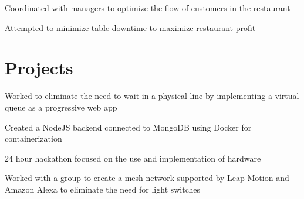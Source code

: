 \documentclass[letterpaper]{deedy-resume} %
\begin{document}
\begin{minipage}[t]{0.66\textwidth}
\sectionspace %




\begin{tightitemize}
\item Coordinated with managers to optimize the flow of customers in the
restaurant
\item Attempted to minimize table downtime to maximize restaurant profit
\end{tightitemize}

\sectionspace %


\section{Projects}


\begin{tightitemize}
\item Worked to eliminate the need to wait in a physical line by implementing a virtual queue as a progressive web app 
\item Created a NodeJS backend connected to MongoDB using Docker for containerization
\end{tightitemize}

\sectionspace %



\begin{tightitemize}
\item 24 hour hackathon focused on the use and
implementation of hardware
\item Worked with a group to create a mesh
network supported by Leap Motion and
Amazon Alexa to eliminate the need for
light switches
\end{tightitemize}

\sectionspace %


\end{minipage}
\end{document}
